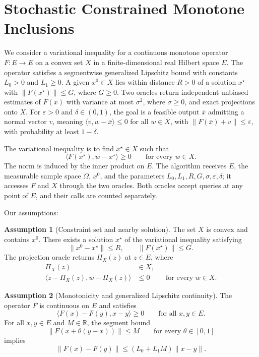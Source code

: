 \documentclass[10pt]{article}
\theoremstyle{definition}
\newtheorem{assumption}{Assumption}
\begin{document}
\section*{Stochastic Constrained Monotone Inclusions}
We consider a variational inequality for a continuous monotone operator $F:E\to E$ on a convex set $X$ in a finite-dimensional real Hilbert space $E$. The operator satisfies a segmentwise generalized Lipschitz bound with constants $L_0>0$ and $L_1\geq0$. A given $x^0\in X$ lies within distance $R>0$ of a solution $x^\star$ with $\|F(x^\star)\|\leq G$, where $G\geq0$. Two oracles return independent unbiased estimates of $F(x)$ with variance at most $\sigma^2$, where $\sigma\geq0$, and exact projections onto $X$. For $\varepsilon>0$ and $\delta\in(0,1)$, the goal is a feasible output $\bar{x}$ admitting a normal vector $v$, meaning $\langle v,w-\bar{x}\rangle\leq0$ for all $w\in X$, with $\|F(\bar{x})+v\|\leq\varepsilon$, with probability at least $1-\delta$.

The variational inequality is to find $x^\star\in X$ such that
\[
\langle F(x^\star),w-x^\star\rangle\geq0
\qquad\text{for every }w\in X.
\]
The norm is induced by the inner product on $E$. The algorithm receives $E$, the measurable sample space $\Omega$, $x^0$, and the parameters $L_0,L_1,R,G,\sigma,\varepsilon,\delta$; it accesses $F$ and $X$ through the two oracles. Both oracles accept queries at any point of $E$, and their calls are counted separately.

Our assumptions:
\begin{assumption}[Constraint set and nearby solution]
The set $X$ is convex and contains $x^0$. There exists a solution $x^\star$ of the variational inequality satisfying
\[
\|x^0-x^\star\|\leq R,
\qquad
\|F(x^\star)\|\leq G.
\]
The projection oracle returns $\Pi_X(z)$ at $z\in E$, where
\[
\begin{aligned}
\Pi_X(z)&\in X,\\
\langle z-\Pi_X(z),w-\Pi_X(z)\rangle&\leq0
&&\text{for every }w\in X.
\end{aligned}
\]
\end{assumption}

\begin{assumption}[Monotonicity and generalized Lipschitz continuity]
The operator $F$ is continuous on $E$ and satisfies
\[
\langle F(x)-F(y),x-y\rangle\geq0
\qquad\text{for all }x,y\in E.
\]
For all $x,y\in E$ and $M\in\mathbb{R}$, the segment bound
\[
\|F(x+\theta(y-x))\|\leq M
\qquad\text{for every }\theta\in[0,1]
\]
implies
\[
\|F(x)-F(y)\|\leq (L_0+L_1M)\|x-y\|.
\]
\end{assumption}
\end{document}
